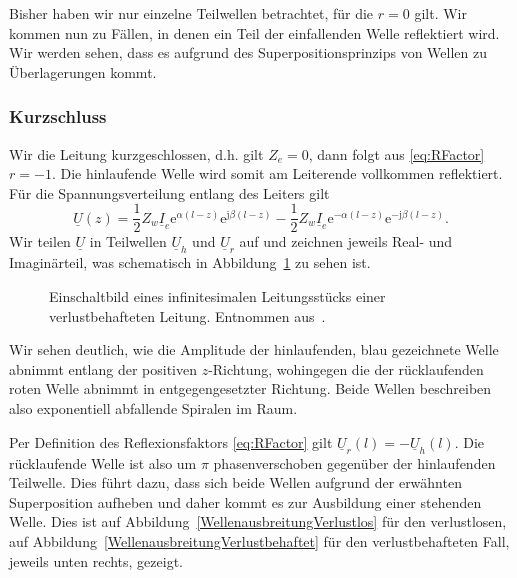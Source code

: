 \documentclass[paper=a4, parskip=half-, ngerman, fontsize=11pt]{scrreprt}
\begin{document}
Bisher haben wir nur einzelne Teilwellen betrachtet, für die $r = 0$ gilt. Wir kommen nun zu Fällen, in denen ein Teil
der einfallenden Welle reflektiert wird. Wir werden sehen, dass es aufgrund des Superpositionsprinzips von Wellen zu
Überlagerungen kommt.


\subsubsection{Kurzschluss}
Wir die Leitung kurzgeschlossen, d.h. gilt $Z_{e} = 0$, dann folgt aus \eqref{eq:RFactor} $r=-1$. Die hinlaufende Welle
wird somit am Leiterende vollkommen reflektiert. Für die Spannungsverteilung entlang des Leiters gilt
\begin{equation}
\underline{U}(z) =
\frac{1}{2} Z_{w} \underline{I}_{e}
\mathrm{e}^{\alpha (l - z)}
\mathrm{e}^{\mathrm{j} \beta (l - z)}
-
\frac{1}{2} Z_{w} \underline{I}_{e}
\mathrm{e}^{- \alpha (l - z)}
\mathrm{e}^{- \mathrm{j} \beta (l - z)} \label{eq:UKurzschluss}.
\end{equation}
Wir teilen $\underline{U}$ in Teilwellen $\underline{U}_{h}$ und $\underline{U}_{r}$ auf und zeichnen jeweils Real-
und Imaginärteil, was schematisch in Abbildung~\ref{ImaginaerWelle} zu sehen ist.
\begin{figure}[ht]
    \begin{center}
        
        \caption{Einschaltbild eines infinitesimalen Leitungsstücks einer verlustbehafteten Leitung. Entnommen
            aus~\cite{LeitungenUndFilter}.}
        \label{ImaginaerWelle}
    \end{center}
\end{figure}
Wir sehen deutlich, wie die Amplitude der hinlaufenden, blau gezeichnete Welle abnimmt entlang der positiven
$z$-Richtung, wohingegen die der rücklaufenden roten Welle abnimmt in entgegengesetzter Richtung. Beide Wellen
beschreiben also exponentiell abfallende Spiralen im Raum.

Per Definition des Reflexionsfaktors \eqref{eq:RFactor} gilt $\underline{U}_{r}(l) = - \underline{U}_{h}(l)$. Die
rücklaufende Welle ist also um $\pi$ phasenverschoben gegenüber der hinlaufenden Teilwelle. Dies führt dazu, dass sich
beide Wellen aufgrund der erwähnten Superposition aufheben und daher kommt es zur Ausbildung einer stehenden Welle.
Dies ist auf Abbildung~\ref{WellenausbreitungVerlustlos} für den verlustlosen, auf
Abbildung~\ref{WellenausbreitungVerlustbehaftet} für den verlustbehafteten Fall, jeweils unten rechts, gezeigt.
\end{document}
